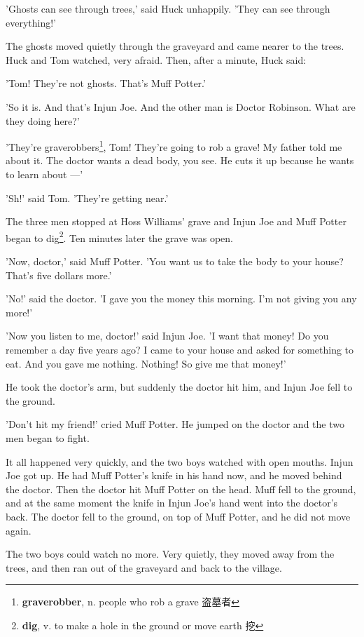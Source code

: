 \documentclass[fontset=ubuntu, zihao=5]{ctexart}
\begin{document}
\begin{paracol}{2}
'Ghosts can see through trees,' said Huck unhappily. 'They can see through everything!'



The ghosts moved quietly through the graveyard and came nearer to the trees. Huck and Tom watched, very afraid. Then, after a minute, Huck said:

'Tom! They're not ghosts. That's Muff Potter.'

'So it is. And that's Injun Joe. And the other man is Doctor Robinson. What are they doing here?'

'They're graverobbers\footnote{\textbf{graverobber}, n. people who rob a grave 盗墓者}, Tom! They're going to rob a grave! My father told me about it. The doctor wants a dead body, you see. He cuts it up because he wants to learn about —'

'Sh!' said Tom. 'They're getting near.'

The three men stopped at Hoss Williams' grave and Injun Joe and Muff Potter began to dig\footnote{\textbf{dig}, v. to make a hole in the ground or move earth 挖}. Ten minutes later the grave was open.

'Now, doctor,' said Muff Potter. 'You want us to take the body to your house? That's five dollars more.'

'No!' said the doctor. 'I gave you the money this morning. I'm not giving you any more!'

'Now you listen to me, doctor!' said Injun Joe. 'I want that money! Do you remember a day five years ago? I came to your house and asked for something to eat. And you gave me nothing. Nothing! So give me that money!'

He took the doctor's arm, but suddenly the doctor hit him, and Injun Joe fell to the ground.

'Don't hit my friend!' cried Muff Potter. He jumped on the doctor and the two men began to fight.



It all happened very quickly, and the two boys watched with open mouths. Injun Joe got up. He had Muff Potter's knife in his hand now, and he moved behind the doctor. Then the doctor hit Muff Potter on the head. Muff fell to the ground, and at the same moment the knife in Injun Joe's hand went into the doctor's back. The doctor fell to the ground, on top of Muff Potter, and he did not move again.

The two boys could watch no more. Very quietly, they moved away from the trees, and then ran out of the graveyard and back to the village.


\end{paracol}
\end{document}

